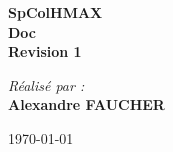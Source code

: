 \begin{center}

{ \Huge \bfseries SpColHMAX\\[1.5cm] }
{ \Large \bfseries Doc \\[1.5cm]}
{ \Large \bfseries Revision 1 }

\vspace*{2cm}

{ \large  \textit{Réalisé par :}  \\[0.4cm] }
{ \large \bfseries Alexandre FAUCHER }

\vspace*{3cm}

{\large \today}
\\[1.5cm]\\[1.5cm]\\[1.5cm]
\vspace*{2cm}



\end{center}
